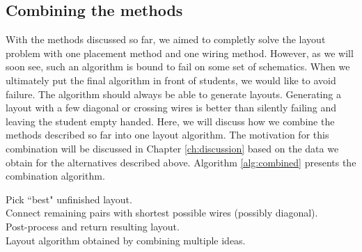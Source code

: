 \subsection{Combining the methods}
\label{sec:combined_alg}

With the methods discussed so far, we aimed to completly solve the layout problem
with one placement method and one wiring method. However, as we will soon see,
such an algorithm is bound to fail on some set of schematics. When we ultimately
put the final algorithm in front of students, we would like to avoid failure.
The algorithm should always be able to generate layouts. Generating a layout
with a few diagonal or crossing wires is better than silently failing and leaving
the student empty handed. Here, we will discuss how we combine the methods
described so far into one layout algorithm. The motivation for this combination
will be discussed in Chapter \ref{ch:discussion} based on the data we obtain
for the alternatives described above. Algorithm \ref{alg:combined} presents the
combination algorithm.

\begin{algorithm}
\BlankLine
{}
Pick ``best" unfinished layout.\\
Connect remaining pairs with shortest possible wires (possibly diagonal).\\
Post-process and return resulting layout.\\
\caption{Layout algorithm obtained by combining multiple ideas.}
\label{alg:combined}
\end{algorithm}

